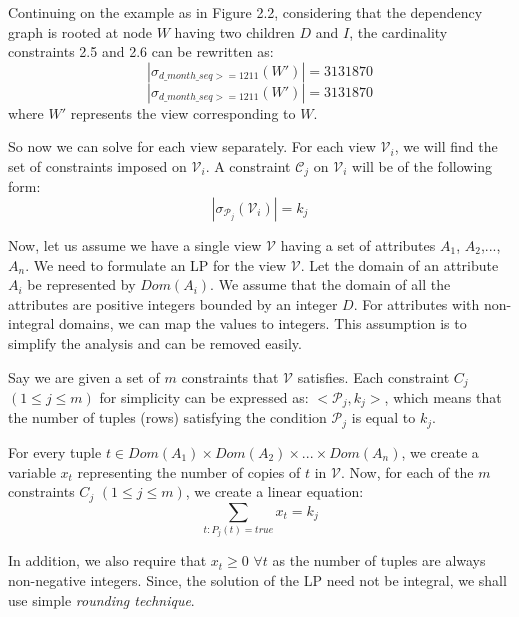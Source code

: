 \documentclass[]{article}
\begin{document}
\begin{multicols}{2}
			Continuing on the example as in Figure 2.2, considering that the dependency graph is rooted at node $W$ having two children $D$ and $I$, the cardinality constraints 2.5 and 2.6 can be rewritten as:
			\begin{equation*}
				|\sigma_{d\_month\_seq >= 1211}(W')| = 3131870
			\end{equation*}
			\begin{equation*}
				|\sigma_{d\_month\_seq >= 1211}(W')| = 3131870
			\end{equation*}
			where $W'$ represents the view corresponding to $W$.
			
			
			So now we can solve for each view separately. 
			For each view $\mathcal{V}_{i}$, we will find the set of constraints imposed on $\mathcal{V}_{i}$. 
			A constraint $\mathcal{C}_{j}$ on $\mathcal{V}_{i}$ will be of the following form:
			\begin{equation*}
				| \sigma_{\mathcal{P}_{j}} (\mathcal{V}_{i})| = k_{j}
			\end{equation*}
			
			Now, let us assume we have a single view $\mathcal{V}$ having a set of attributes $A_{1}$, $A_{2}$,...,$A_{n}$. 
			We need to formulate an LP for the view $\mathcal{V}$. 
			Let the domain of an attribute $A_{i}$ be represented by $Dom(A_{i})$. 
			We assume that the domain of all the attributes are positive integers bounded by an integer $D$. 
			For attributes with non-integral domains, we can map the values to integers. 
			This assumption is to simplify the analysis and can be removed easily.
			
			Say we are given a set of $m$ constraints that $\mathcal{V}$ satisfies. 
			Each constraint $C_{j}$  $(1 \leq j \leq m)$ for simplicity can be expressed as: $<\mathcal{P}_{j}, k_{j}>$, which means that the number of tuples (rows) satisfying the condition $\mathcal{P}_{j}$ is equal to $k_{j}$. 
			
			For every tuple $t \in Dom(A_{1}) \times Dom(A_{2})\times...\times Dom(A_{n})$, we create a variable $x_{t}$ representing the number of copies of $t$ in $\mathcal{V}$. 
			Now, for each of the $m$ constraints $C_{j}$ $(1 \leq j \leq m)$, we create a linear equation:
			\begin{equation*}
				\sum_{t:P_{j}(t)=true} x_{t} = k_{j}
			\end{equation*}
			
			In addition, we also require that $x_{t} \geq 0$ $\forall t$ as the number of tuples are always non-negative integers. 
			Since, the solution of the LP need not be integral, we shall use simple {\em rounding technique}. 
			

\end{multicols}
\end{document}
